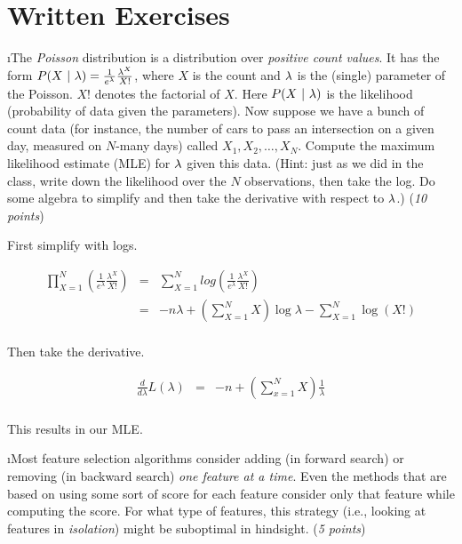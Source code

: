 \documentclass[fleqn]{article}
\begin{document}

\section{Written Exercises}

\bee

\i The \emph{Poisson} distribution is a distribution over
\emph{positive count values}.  It has the form $P(X \textrm{~}\arrowvert\textrm{~} \lambda) = \frac 1
{e^{\lambda}} \frac {\lambda^X} {X!}$, where $X$ is the count and $\lambda$ is the
(single) parameter of the Poisson. $X!$ denotes the factorial of $X$. 
Here $P(X \textrm{~}\arrowvert\textrm{~} \lambda)$ is the likelihood (probability of data given the 
parameters). Now suppose we have a bunch of count data (for 
instance, the number of cars to pass an intersection on a given day, 
measured on $N$-many days) called $X_1, X_2, \dots, X_N$. Compute the 
maximum likelihood estimate (MLE) for $\lambda$ given this data. (Hint: 
just as we did in the class, write down the likelihood over the $N$
observations, then take the log. Do some algebra to simplify and then 
take the derivative with respect to $\lambda$.) (\textit{10 points})

\begin{solution}
First simplify with logs.

\begin{eqnarray*}
\prod^N_{X = 1} (\frac{1}{e^\lambda} \frac{\lambda^X}{X!}) & = & \sum^N_{X=1} log (\frac{1}{e^\lambda} \frac{\lambda^X}{X!}) \\
& = & -n\lambda + (\sum^N_{X=1} X) \log \lambda - \sum^N_{X=1} \log(X!) \\
\end{eqnarray*}

Then take the derivative.

\begin{eqnarray*}
\frac{d}{d\lambda}L(\lambda) & = & -n + (\sum^N_{x=1} X) \frac{1}{\lambda} \\
\end{eqnarray*}

This results in our MLE.

\end{solution}

\i Most feature selection algorithms consider adding (in forward search)
or removing (in backward search) \textit{one feature at a time}. Even the
methods that are based on using some sort of score for each feature consider
only that feature while computing the score. For what type of features, this
strategy (i.e., looking at features in \textit{isolation}) might be suboptimal 
in hindsight. (\textit{5 points})
\end{document}
